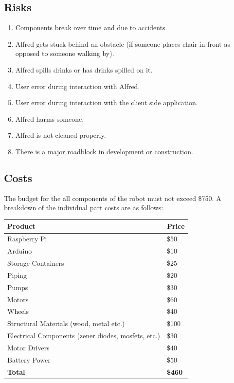 \documentclass [11pt]{article}
\begin{document}
\subsection{Risks}
	\begin{enumerate}[label=\textbf{(\roman*)}]
		\item Components break over time and due to accidents.
		\item Alfred gets stuck behind an obstacle (if someone places chair in front as opposed to someone walking by).
		\item Alfred spills drinks or has drinks spilled on it.
		\item User error during interaction with Alfred.
		\item User error during interaction with the client side application.
		\item Alfred harms someone.
		\item Alfred is not cleaned properly.
		\item There is a major roadblock in development or construction.
	\end{enumerate}

\pagebreak
\subsection{Costs}	
The budget for the all components of the robot must not exceed \$750. A breakdown of the individual part costs are as follows:

\begin{center}
\begin{tabular}{ | p{8.5cm} | p{1.5cm} | } \hline
 \textbf{Product} & \textbf{Price}  \\ \hline
 Raspberry Pi & \$50  \\ \hline
 Arduino & \$10 \\ \hline
 Storage Containers & \$25 \\ \hline
 Piping & \$20 \\ \hline
 Pumps & \$30 \\ \hline
 Motors & \$60 \\ \hline
 Wheels & \$40 \\ \hline
 Structural Materials (wood, metal etc.) & \$100 \\ \hline
 Electrical Components (zener diodes, mosfets, etc.) & \$30 \\ \hline
 Motor Drivers & \$40 \\ \hline
 Battery Power & \$50 \\ \hline
 \textbf{Total} & \textbf{\$460} \\ \hline
\end{tabular}
\end{center}
\end{document}
